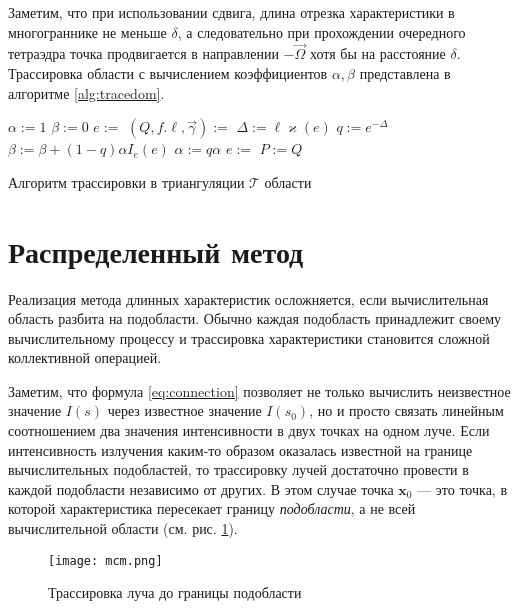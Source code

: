 Заметим, что при использовании сдвига, длина отрезка характеристики в многограннике не меньше $\delta$, а следовательно при прохождении очередного тетраэдра точка продвигается в направлении $-\vec \Omega$ хотя бы на расстояние $\delta$.
Трассировка области с вычислением коэффициентов $\alpha, \beta$ представлена в алгоритме \ref{alg:tracedom}.

\begin{algorithm}[ht!]
\centering
\begin{algorithmic}[1]
\State $\alpha := 1$
\State $\beta := 0$
\State $e := $ 
\Repeat
\State $(Q, f. \ell, \vec\gamma) :=$ 
\State $\Delta := \ell \varkappa(e) $
\State $q := e^{-\Delta}$
\State $\beta := \beta + (1 - q)\alpha I_e(e)$
\State $\alpha := q\alpha$
\State $e := $ 
\State $P := Q$
\State{}
\EndFunction
\end{algorithmic}
\caption{Алгоритм трассировки в триангуляции $\mathcal{T}$ области}
\label{alg:tracedom}
\end{algorithm}

\section{Распределенный метод}

Реализация метода длинных характеристик осложняется, если вычислительная область разбита на подобласти. Обычно каждая подобласть принадлежит своему вычислительному процессу и трассировка характеристики становится сложной коллективной операцией.

Заметим, что формула \eqref{eq:connection} позволяет не только вычислить неизвестное значение $I(s)$ через известное значение $I(s_0)$, но и просто связать
линейным соотношением два значения интенсивности в двух точках на одном луче.
Если интенсивность излучения каким-то образом оказалась известной на границе вычислительных подобластей, то трассировку лучей достаточно провести в каждой подобласти независимо от других. В этом случае точка $\mathbf x_0$ --- это точка, в которой характеристика пересекает границу \emph{подобласти}, а не всей вычислительной области (см. рис. \ref{fig:mcm}).

\begin{figure}[ht]
\centering
\texttt{[image: mcm.png]}
\caption{Трассировка луча до границы подобласти}
\label{fig:mcm}
\end{figure}

